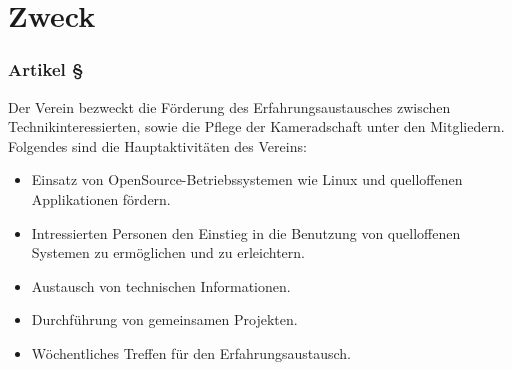 \section{Zweck}

\subsubsection*{Artikel §\articlenumber}
Der Verein bezweckt die Förderung des Erfahrungsaustausches zwischen
Technikinteressierten, sowie die Pflege der Kameradschaft unter den
Mitgliedern.\newline \newline
Folgendes sind die Hauptaktivitäten des Vereins:

\begin{itemize}
	\item Einsatz von OpenSource-Betriebssystemen wie Linux und
		quelloffenen Applikationen fördern.
	\item Intressierten Personen den Einstieg in die Benutzung von
		quelloffenen Systemen zu ermöglichen und zu erleichtern.
	\item Austausch von technischen Informationen.
	\item Durchführung von gemeinsamen Projekten.
	\item Wöchentliches Treffen für den Erfahrungsaustausch.
\end{itemize}
